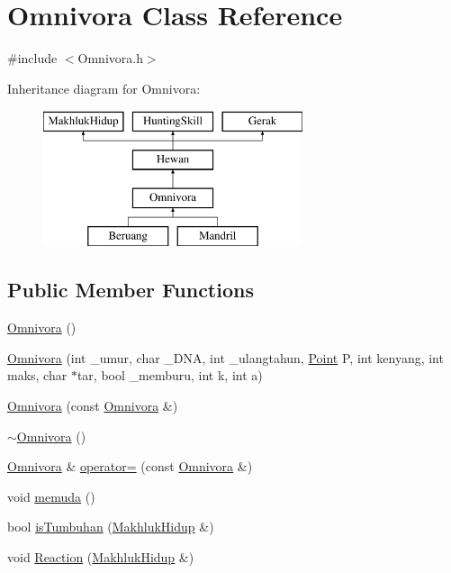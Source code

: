 \hypertarget{class_omnivora}{}\section{Omnivora Class Reference}
\label{class_omnivora}


{\ttfamily \#include $<$Omnivora.\+h$>$}

Inheritance diagram for Omnivora\+:\begin{figure}[H]
\begin{center}
\leavevmode
\includegraphics[height=4.000000cm]{class_omnivora}
\end{center}
\end{figure}
\subsection*{Public Member Functions}
\begin{DoxyCompactItemize}
\item 
\hyperlink{class_omnivora_a5073dcd66e4ebe988dffbafd2bb9b745}{Omnivora} ()
\item 
\hyperlink{class_omnivora_a1fb1d0e6f790f45af95f9887b20e24ad}{Omnivora} (int \+\_\+umur, char \+\_\+\+D\+NA, int \+\_\+ulangtahun, \hyperlink{class_point}{Point} P, int kenyang, int maks, char $\ast$tar, bool \+\_\+memburu, int k, int a)
\item 
\hyperlink{class_omnivora_afb44343570d732d361bfc7630da078c7}{Omnivora} (const \hyperlink{class_omnivora}{Omnivora} \&)
\item 
\hyperlink{class_omnivora_a37db286415e25f2f470a39b8405e2b58}{$\sim$\+Omnivora} ()
\item 
\hyperlink{class_omnivora}{Omnivora} \& \hyperlink{class_omnivora_a5e805170a3e3bd6ab15763229e58eb63}{operator=} (const \hyperlink{class_omnivora}{Omnivora} \&)
\item 
void \hyperlink{class_omnivora_a73ce54c452342971c4e1208ece7900b9}{memuda} ()
\item 
bool \hyperlink{class_omnivora_a2e63b0beba365ec5e3ec79975fe1204c}{is\+Tumbuhan} (\hyperlink{class_makhluk_hidup}{Makhluk\+Hidup} \&)
\item 
void \hyperlink{class_omnivora_a1b8937b59e4606e6088add7c10bf3f60}{Reaction} (\hyperlink{class_makhluk_hidup}{Makhluk\+Hidup} \&)
\end{DoxyCompactItemize}


